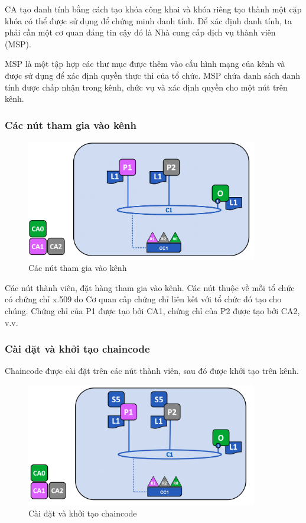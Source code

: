 CA tạo danh tính bằng cách tạo khóa công khai và khóa riêng tạo thành một cặp khóa có thể được sử dụng 
để chứng minh danh tính. Để xác định danh tính, ta phải cần một cơ quan đáng tin cậy đó là Nhà cung cấp dịch vụ thành viên (MSP).

MSP là một tập hợp các thư mục được thêm vào cấu hình mạng của kênh và được sử dụng để xác định 
quyền thực thi của tổ chức. MSP chứa danh sách danh tính được chấp nhận trong kênh, chức 
vụ và xác định quyền cho một nút trên kênh. 


\subsubsection{Các nút tham gia vào kênh}

\begin{figure}[h]
    \centering
    \includegraphics[width=0.9\textwidth]{images/join_network.png}
    \caption{Các nút tham gia vào kênh }
\end{figure}

Các nút thành viên, đặt hàng tham gia vào kênh. Các nút thuộc về mỗi tổ chức có chứng chỉ x.509 do Cơ quan cấp chứng chỉ 
liên kết với tổ chức đó tạo cho chúng. Chứng chỉ của P1 được tạo bởi CA1, chứng chỉ của P2 được tạo 
bởi CA2, v.v.

\subsubsection{Cài đặt và khởi tạo chaincode}

Chaincode được cài đặt trên các nút thành viên, sau đó được khởi tạo trên kênh. 

\begin{figure}[h]
    \centering
    \includegraphics[width=0.9\textwidth]{images/install_chaincode.png}
    \caption{Cài đặt và khởi tạo chaincode}
\end{figure}

